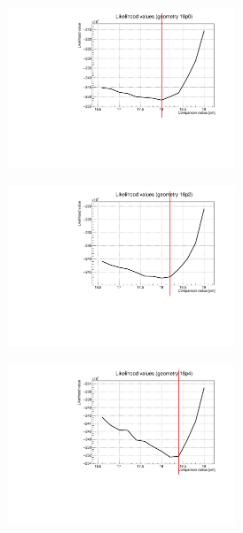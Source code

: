 \documentclass[a4paper, 11pt, twoside, openright]{report}
\begin{document}
\begin{figure}[htbp]
\begin{minipage}[b]{.32\textwidth}
\includegraphics[width=6cm, height=4.6cm]{figs/likelihood100LowStat/likelihood18p0.pdf}
\end{minipage}\hfill
\begin{minipage}[b]{.32\textwidth}
\includegraphics[width=6cm, height=4.6cm]{figs/likelihood100LowStat/likelihood18p2.pdf}
\end{minipage} \hfill
\begin{minipage}[b]{.32\textwidth}
\includegraphics[width=6cm, height=4.6cm]{figs/likelihood100LowStat/likelihood18p4.pdf}
\end{minipage} \hfill \vspace{10pt}


\end{figure}
\end{document}
